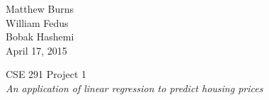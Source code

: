 \documentclass[12pt,oneside]{article}
\begin{document}
\setlength{\belowdisplayskip}{5pt} \setlength{\belowdisplayshortskip}{0pt}
\setlength{\abovedisplayskip}{-10pt} \setlength{\abovedisplayshortskip}{0pt}

\begin{flushright}
Matthew Burns \\
William Fedus \\
Bobak Hashemi \\
April 17, 2015 \\
\end{flushright}


\begin{center}
CSE 291 Project 1\\
\emph{An application of linear regression to predict housing prices}
\end{center}
\end{document}

